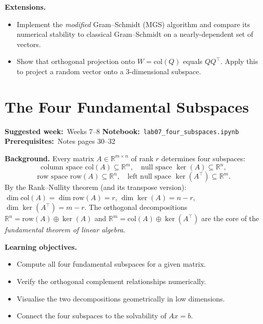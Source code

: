 \documentclass[11pt, a4paper]{article}
\newcommand{\labmeta}[3]{%
  \begin{prereqbox}
  \textbf{Suggested week:}~#1 \quad
  \textbf{Notebook:}~\texttt{#2} \quad
  \textbf{Prerequisites:}~#3
  \end{prereqbox}
  \vspace{4pt}
}
\newcommand{\objectives}[1]{%
  \textbf{\color{prereqcolor}Learning objectives.}\vspace{2pt}
  \begin{itemize}[leftmargin=1.6em, itemsep=1pt] #1 \end{itemize}
}
\newcommand{\extensions}[1]{%
  \textbf{\color{notecolor}Extensions.}
  \begin{itemize}[leftmargin=1.6em, itemsep=1pt] #1 \end{itemize}
}
\begin{document}
\extensions{
  \item Implement the \emph{modified} Gram--Schmidt (MGS) algorithm and compare its
        numerical stability to classical Gram--Schmidt on a nearly-dependent set of vectors.
  \item Show that orthogonal projection onto $W = \mathrm{col}(Q)$ equals $QQ^\top$.
        Apply this to project a random vector onto a 3-dimensional subspace.
}

\section{The Four Fundamental Subspaces}
\label{lab:fourspaces}

\labmeta{Weeks 7--8}{lab07\_four\_subspaces.ipynb}{Notes pages 30--32}

\vspace{4pt}

\noindent\textbf{Background.}
Every matrix $A \in \mathbb{R}^{m\times n}$ of rank $r$ determines four subspaces:
\[
  \text{column space } \mathrm{col}(A) \subseteq \mathbb{R}^m, \quad
  \text{null space } \ker(A) \subseteq \mathbb{R}^n,
\]
\[
  \text{row space } \mathrm{row}(A) \subseteq \mathbb{R}^n, \quad
  \text{left null space } \ker(A^\top) \subseteq \mathbb{R}^m.
\]
By the Rank--Nullity theorem (and its transpose version):
$\dim\mathrm{col}(A) = \dim\mathrm{row}(A) = r$,
$\dim\ker(A) = n - r$, $\dim\ker(A^\top) = m - r$.
The orthogonal decompositions $\mathbb{R}^n = \mathrm{row}(A) \oplus \ker(A)$ and
$\mathbb{R}^m = \mathrm{col}(A) \oplus \ker(A^\top)$ are the core of the
\emph{fundamental theorem of linear algebra}.

\objectives{
  \item Compute all four fundamental subspaces for a given matrix.
  \item Verify the orthogonal complement relationships numerically.
  \item Visualise the two decompositions geometrically in low dimensions.
  \item Connect the four subspaces to the solvability of $Ax = b$.
}
\end{document}
